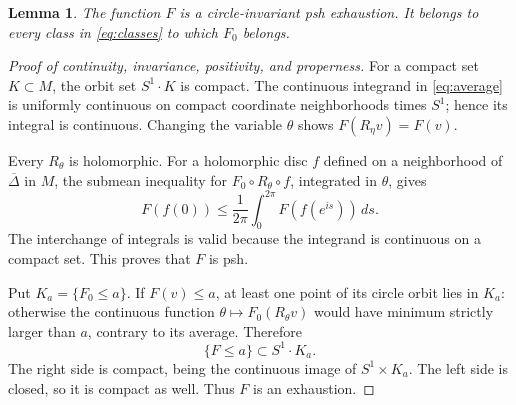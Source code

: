 \documentclass[11pt]{amsart}
\newtheorem{lemma}[theorem]{Lemma}
\theoremstyle{definition}
\theoremstyle{remark}
\numberwithin{equation}{section}
\begin{document}
\begin{lemma}\label{lem:average}
The function $F$ is a circle-invariant psh exhaustion. It belongs
to every class in \eqref{eq:classes} to which $F_0$ belongs.
\end{lemma}

\begin{proof}[Proof of continuity, invariance, positivity, and properness]
For a compact set $K\subset M$, the orbit set $S^1\cdot K$ is compact.
The continuous integrand in \eqref{eq:average} is uniformly continuous
on compact coordinate neighborhoods times $S^1$; hence its integral
is continuous. Changing the variable $\theta$ shows
$F(R_\eta v)=F(v)$.

Every $R_\theta$ is holomorphic. For a holomorphic disc $f$ defined
on a neighborhood of $\overline\Delta$ in $M$, the submean inequality
for $F_0\circ R_\theta\circ f$, integrated in $\theta$, gives
\[
F(f(0))\le\frac1{2\pi}\int_0^{2\pi}F(f(e^{is}))\,ds.
\]
The interchange of integrals is valid because the integrand is
continuous on a compact set. This proves that $F$ is psh.

Put $K_a=\{F_0\le a\}$. If $F(v)\le a$, at least one point of its
circle orbit lies in $K_a$: otherwise the continuous function
$\theta\mapsto F_0(R_\theta v)$ would have minimum strictly larger
than $a$, contrary to its average. Therefore
\begin{equation}\label{eq:saturation}
\{F\le a\}\subset S^1\cdot K_a.
\end{equation}
The right side is compact, being the continuous image of
$S^1\times K_a$. The left side is closed, so it is compact as well.
Thus $F$ is an exhaustion.
\end{proof}
\end{document}
